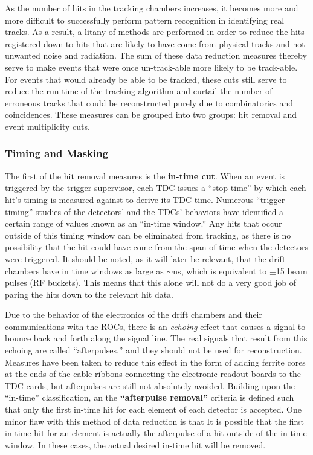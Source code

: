 As the number of hits in the tracking chambers increases, it becomes more and more difficult to successfully perform pattern recognition in identifying real tracks. As a result, a litany of methods are performed in order to reduce the hits registered down to hits that are likely to have come from physical tracks and not unwanted noise and radiation. The sum of these data reduction measures thereby serve to make events that were once un-track-able more likely to be track-able. For events that would already be able to be tracked, these cuts still serve to reduce the run time of the tracking algorithm and curtail the number of erroneous tracks that could be reconstructed purely due to combinatorics and coincidences. These measures can be grouped into two groups: hit removal and event multiplicity cuts.

\subsubsection{Timing and Masking}

The first of the hit removal measures is the \textbf{in-time cut}. When an event is triggered by the trigger supervisor, each TDC issues a ``stop time'' by which each hit's timing is measured against to derive its TDC time. Numerous ``trigger timing'' studies of the detectors' and the TDCs' behaviors have identified a certain range of values known as an ``in-time window.'' Any hits that occur outside of this timing window can be eliminated from tracking, as there is no possibility that the hit could have come from the span of time when the detectors were triggered. It should be noted, as it will later be relevant, that the drift chambers have in time windows as large as $\sim$\unit[600]{ns}, which is equivalent to $\pm$15 beam pulses (RF buckets). This means that this alone will not do a very good job of paring the hits down to the relevant hit data.

Due to the behavior of the electronics of the drift chambers and their communications with the ROCs, there is an \emph{echoing} effect that causes a signal to bounce back and forth along the signal line. The real signals that result from this echoing are called ``afterpulses,'' and they should not be used for reconstruction. Measures have been taken to reduce this effect in the form of adding ferrite cores at the ends of the cable ribbons connecting the electronic readout boards to the TDC cards, but afterpulses are still not absolutely avoided. Building upon the ``in-time'' classification, an the \textbf{``afterpulse removal''} criteria is defined such that only the first in-time hit for each element of each detector is accepted. One minor flaw with this method of data reduction is that It is possible that the first in-time hit for an element is actually the afterpulse of a hit outside of the in-time window. In these cases, the actual desired in-time hit will be removed.

